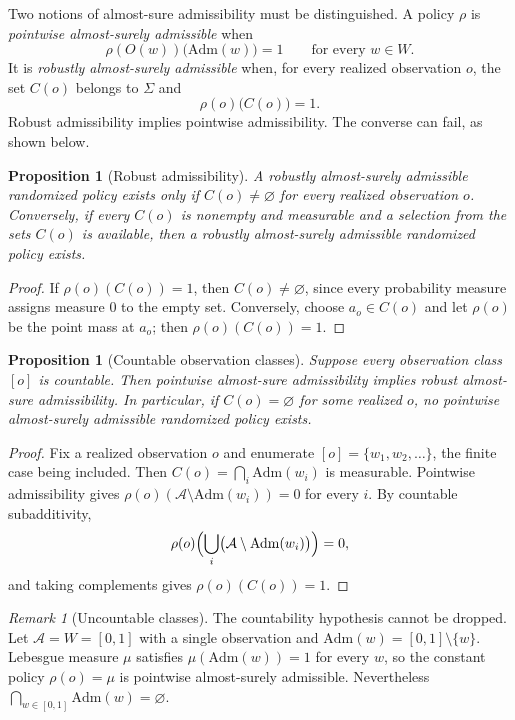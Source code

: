 \documentclass[11pt]{article}
\newtheorem{proposition}[theorem]{Proposition}
\theoremstyle{definition}
\theoremstyle{remark}
\newtheorem{remark}[theorem]{Remark}
\newcommand{\worlds}{W}
\newcommand{\acts}{\mathcal{A}}
\newcommand{\admissible}{\mathrm{Adm}}
\begin{document}
Two notions of almost-sure admissibility must be distinguished. A policy
$\rho$ is \emph{pointwise almost-surely admissible} when
\[
  \rho(O(w))\bigl(\admissible(w)\bigr)=1
  \qquad
  \text{for every }w\in\worlds.
\]
It is \emph{robustly almost-surely admissible} when, for every realized
observation $o$, the set $C(o)$ belongs to $\Sigma$ and
\[
  \rho(o)\bigl(C(o)\bigr)=1.
\]
Robust admissibility implies pointwise admissibility. The converse can fail,
as shown below.

\begin{proposition}[Robust admissibility]
A robustly almost-surely admissible randomized policy exists only if
$C(o)\neq\varnothing$ for every realized observation $o$. Conversely, if every
$C(o)$ is nonempty and measurable and a selection from the sets $C(o)$ is
available, then a robustly almost-surely admissible randomized policy exists.
\end{proposition}

\begin{proof}
If $\rho(o)(C(o))=1$, then $C(o)\neq\varnothing$, since every probability
measure assigns measure $0$ to the empty set. Conversely, choose $a_o\in C(o)$
and let $\rho(o)$ be the point mass at $a_o$; then $\rho(o)(C(o))=1$.
\end{proof}

\begin{proposition}[Countable observation classes]
Suppose every observation class $[o]$ is countable. Then pointwise
almost-sure admissibility implies robust almost-sure admissibility. In
particular, if $C(o)=\varnothing$ for some realized $o$, no pointwise
almost-surely admissible randomized policy exists.
\end{proposition}

\begin{proof}
Fix a realized observation $o$ and enumerate $[o]=\{w_1,w_2,\ldots\}$, the
finite case being included. Then $C(o)=\bigcap_i\admissible(w_i)$ is
measurable. Pointwise admissibility gives
$\rho(o)(\acts\setminus\admissible(w_i))=0$ for every $i$. By countable
subadditivity,
\[
  \rho(o)\Bigl(\bigcup_i\bigl(\acts\setminus\admissible(w_i)\bigr)\Bigr)=0,
\]
and taking complements gives $\rho(o)(C(o))=1$.
\end{proof}

\begin{remark}[Uncountable classes]
The countability hypothesis cannot be dropped. Let $\acts=\worlds=[0,1]$
with a single observation and $\admissible(w)=[0,1]\setminus\{w\}$. Lebesgue
measure $\mu$ satisfies $\mu(\admissible(w))=1$ for every $w$, so the constant
policy $\rho(o)=\mu$ is pointwise almost-surely admissible. Nevertheless
$\bigcap_{w\in[0,1]}\admissible(w)=\varnothing$.
\end{remark}
\end{document}
